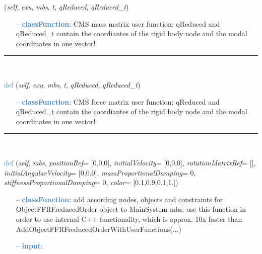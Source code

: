 \begin{itemize}[leftmargin=1.4cm]
\begin{itemize}[leftmargin=0.5cm]
\begin{itemize}[leftmargin=1.4cm]
\begin{itemize}[leftmargin=0.5cm]
\begin{flushleft}
({\it self}, {\it exu}, {\it mbs}, {\it t}, {\it qReduced}, {\it qReduced\_t})
\end{flushleft}
\setlength{\itemindent}{0.7cm}
\begin{itemize}[leftmargin=0.7cm]
  \item[--]  \textcolor{steelblue}{\bf classFunction}: CMS mass matrix user function; qReduced and qReduced\_t contain the coordiantes of the rigid body node and the modal coordinates in one vector!\vspace{12pt}\end{itemize}
%
\noindent\rule{8cm}{0.75pt}\vspace{1pt} \\ 
\begin{flushleft}
\noindent \textcolor{steelblue}{def {\bf {}}}\label{sec:FEM:ObjectFFRFreducedOrderInterface:UFforceFFRFreducedOrder}
({\it self}, {\it exu}, {\it mbs}, {\it t}, {\it qReduced}, {\it qReduced\_t})
\end{flushleft}
\setlength{\itemindent}{0.7cm}
\begin{itemize}[leftmargin=0.7cm]
  \item[--]  \textcolor{steelblue}{\bf classFunction}: CMS force matrix user function; qReduced and qReduced\_t contain the coordiantes of the rigid body node and the modal coordinates in one vector!\vspace{12pt}\end{itemize}
%
\noindent\rule{8cm}{0.75pt}\vspace{1pt} \\ 
\begin{flushleft}
\noindent \textcolor{steelblue}{def {\bf {}}}\label{sec:FEM:ObjectFFRFreducedOrderInterface:AddObjectFFRFreducedOrder}
({\it self}, {\it mbs}, {\it positionRef}= [0,0,0], {\it initialVelocity}= [0,0,0], {\it rotationMatrixRef}= [], {\it initialAngularVelocity}= [0,0,0], {\it massProportionalDamping}= 0, {\it stiffnessProportionalDamping}= 0, {\it color}= [0.1,0.9,0.1,1.])
\end{flushleft}
\setlength{\itemindent}{0.7cm}
\begin{itemize}[leftmargin=0.7cm]
  \item[--]  \textcolor{steelblue}{\bf classFunction}: add according nodes, objects and constraints for ObjectFFRFreducedOrder object to MainSystem mbs; use this function in order to use internal C++ functionality, which is approx. 10x faster than AddObjectFFRFreducedOrderWithUserFunctions(...)  \item[--]  \textcolor{steelblue}{\bf input}: \vspace{-6pt}

\end{itemize}
\end{itemize}
\end{itemize}
\end{itemize}
\end{itemize}
